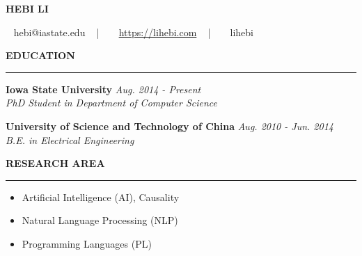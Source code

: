 \documentclass[10pt,letterpaper]{article}
\newenvironment{mysection}[1]{ %
  \medskip
  \MakeUppercase{\bf #1}
  \medskip
  \hrule
  \medskip
  \begin{list}{}{
      \setlength{\leftmargin}{1.5em}
    }
  \item[]
}{
  \end{list}
}
\begin{document}
\centerline{\MakeUppercase{\huge\bf Hebi Li}}
\medskip
\centerline{\faEnvelope ~ hebi@iastate.edu ~ | ~ \faHome ~
  \href{http://lihebi.com}{https://lihebi.com} ~ | ~ \faGithubSquare ~ lihebi
}

\begin{mysection}{Education}
  \textbf{Iowa State University} \hfill \emph{Aug. 2014 - Present} \\
  \emph{PhD Student in Department of Computer Science}

  \textbf{University of Science and Technology of China}
  \hfill \emph{Aug. 2010 - Jun. 2014} \\
  \emph{B.E. in Electrical Engineering}
\end{mysection}


  \begin{mysection}{Research Area}
    \begin{itemize}
    \item Artificial Intelligence (AI), Causality
    \item Natural Language Processing (NLP)
    \item Programming Languages (PL)
    \end{itemize}
  \end{mysection}
  
\end{document}
